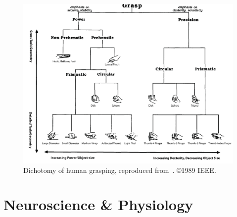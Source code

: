 \begin{landscape}
\begin{figure}
    \includegraphics[width=\linewidth]{images/grasp_dichotomy}
    \caption{Dichotomy of human grasping, reproduced from~\cite{cutkosky1989grasp}. \copyright 1989 IEEE. }
    \label{fig:grasp_dichotomy}
\end{figure}
\end{landscape}

\section{Neuroscience \& Physiology}



